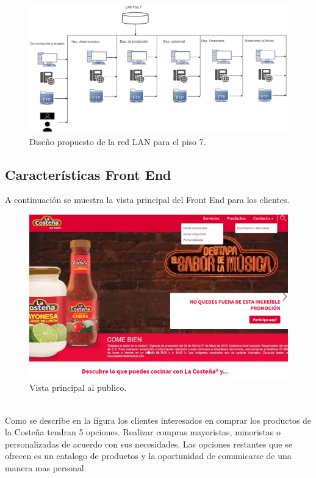 \documentclass[12pt,letterpaper]{article}
\begin{document}
\newpage
\begin{figure}[ht]
    \centering
    \includegraphics[width=.9\textwidth,angle=90]{imagenes/Lan7.png}
    \caption{Diseño propuesto de la red LAN para el piso 7.}
\end{figure}

\newpage
\subsection{Características Front End}
A continuación se muestra la vista principal del Front End para los clientes.
\begin{figure}[ht]
    \centering
    \includegraphics[width=1\textwidth]{imagenes/fron0.png}
    \caption{Vista principal al publico.}
\end{figure}
\\
Como se describe en la fígura los clientes interesados en comprar los productos de la Costeña 
tendran 5 opciones. Realizar compras mayoristas, minoristas o personalizadas de acuerdo con 
sus necesidades. Las opciones restantes que se ofrecen es un catalogo de productos y la oportunidad 
de comunicarse de una manera mas personal.
\end{document}
